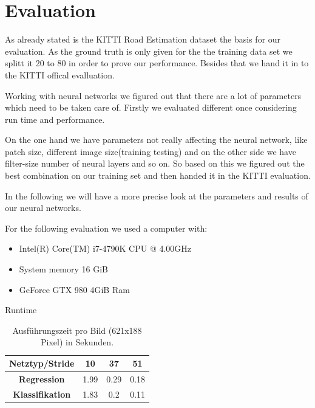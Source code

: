 
\section{Evaluation}\label{sec:evaluation}

As already stated is the KITTI Road Estimation dataset the basis for our evaluation. As the ground truth is only given for the the training data set we splitt it 20 to 80 in order to prove our performance. Besides that we hand it in to the KITTI offical evalluation.

Working with neural networks we figured out that there are a lot of parameters which need to be taken care of. Firstly we evaluated different once considering run time and performance.

On the one hand we have parameters not really affecting the neural network, like patch size, different image size(training testing) and on the other side
we have filter-size number of neural layers and so on.
So based on this we figured out the best combination on our training set and then handed it in the KITTI evaluation.

In the following we will have a more precise look at the parameters and results of our neural networks.

For the following evaluation we used a computer with:
\begin{itemize}
\item Intel(R) Core(TM) i7-4790K CPU @ 4.00GHz
\item System memory 16 GiB
\item GeForce GTX 980 4GiB Ram
\end{itemize}

Runtime
      \begin{table}[h!]
  \begin{center}
    \begin{tabular}{c|ccc}
    \toprule
      \textbf{Netztyp/Stride} & \textbf{10} & \textbf{37} & \textbf{51} \\
     \midrule
      \textbf{Regression} & 1.99 & 0.29 & 0.18 \\
      \textbf{Klassifikation} & 1.83 & 0.2 & 0.11\\
      \bottomrule
    \end{tabular}
        \caption{Ausf\"uhrungszeit pro Bild (621x188 Pixel) in Sekunden.}
  \end{center}
\end{table}

